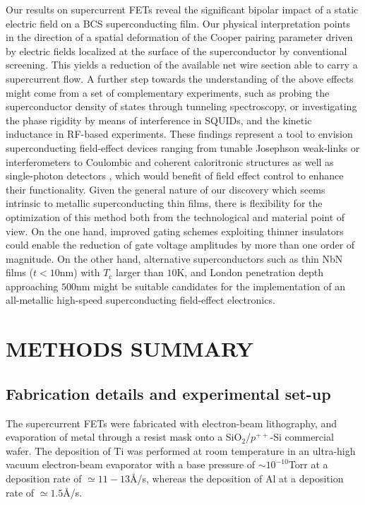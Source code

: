 \documentclass[prl,twocolumn,reprint,graphicx,showpacs,superscriptaddress,floatfix]{revtex4-1}
\begin{document}
Our results on supercurrent FETs reveal the significant bipolar impact of a static electric field on a BCS superconducting film. 
Our physical interpretation points in the direction  of a spatial deformation of the Cooper pairing parameter driven by electric fields localized at the surface of the superconductor by conventional screening. This yields a reduction of the available net wire section able to carry a supercurrent flow.
A further step towards the understanding of the above effects might come from a set of complementary experiments, such as probing the superconductor density of states through tunneling spectroscopy, or investigating the phase rigidity by means of interference in SQUIDs, and the kinetic inductance in RF-based experiments.
These findings represent a tool to envision superconducting  field-effect devices ranging from tunable Josephson weak-links \cite{Marcus1,Marcus2}  or interferometers \cite{Clarke2004,Ronzani2014,Strambini2016} to  Coulombic \cite{Coulomb,Pekola2007} and coherent caloritronic structures \cite{Fornieri2017,Martinez2014} as well as single-photon detectors \cite{spd,Giazotto2008}, which would benefit of field effect control to enhance their functionality.  
Given the general  nature of our discovery which seems intrinsic to metallic superconducting thin films, there is flexibility for the optimization of this method both from the technological and material point of view. 
On the one hand, improved gating schemes exploiting thinner insulators could enable the reduction of gate voltage amplitudes by more than one order of magnitude. 
On the other hand, alternative superconductors such as thin NbN films ($t<10$nm) with $ T_c$ larger than $10$K,  and London penetration depth approaching $500$nm \cite{NbN1,NbN2} might be suitable candidates for the implementation of an all-metallic high-speed superconducting field-effect electronics.




\section{METHODS SUMMARY}
\subsection{Fabrication details and experimental set-up}

The supercurrent FETs were  fabricated with electron-beam lithography, and evaporation of metal through a resist mask onto a SiO$_2$/$p^{++}$-Si
commercial wafer. The deposition of Ti was performed at room temperature in an ultra-high vacuum
electron-beam evaporator with a base pressure of $\sim 10^{-10}$Torr at a deposition rate of $\simeq 11-13${\AA}/s, whereas
the deposition of Al at a deposition rate of $\simeq 1.5${\AA}/s.
\end{document}
